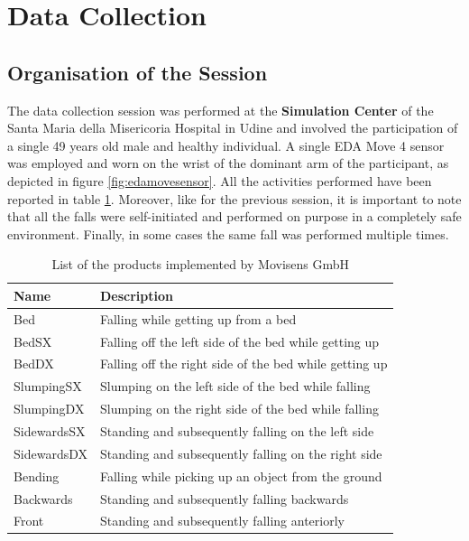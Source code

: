 \section{Data Collection}\label{sec:edamove4-data-collection}

\subsection{Organisation of the Session}\label{subsec:session-org}

The data collection session was performed at the \textbf{Simulation Center} of the Santa Maria della Misericoria Hospital in Udine and involved the participation of a single 49 years old male and healthy individual. A single EDA Move 4 sensor was employed and worn on the wrist of the dominant arm of the participant, as depicted in figure \ref{fig:edamovesensor}. All the activities performed have been reported in table \ref{toc:falls-performed-edamove}. Moreover, like for the previous session, it is important to note that all the falls were self-initiated and performed on purpose in a completely safe environment. Finally, in some cases the same fall was performed multiple times.

\begin{table}[H]
\centering
\begin{tabular}{ll}
    \hline
    Name         & Description \\
    \hline
    Bed          & Falling while getting up from a bed \\
    BedSX        & Falling off the left side of the bed while getting up\\
    BedDX        & Falling off the right side of the bed while getting up \\
    SlumpingSX   & Slumping on the left side of the bed while falling  \\
    SlumpingDX   & Slumping on the right side of the bed while falling  \\
    SidewardsSX  & Standing and subsequently falling on the left side \\ 
    SidewardsDX  & Standing and subsequently falling on the right side \\ 
    Bending      & Falling while picking up an object from the ground \\ 
    Backwards    & Standing and subsequently falling backwards \\
    Front        & Standing and subsequently falling anteriorly  \\
    \hline
\end{tabular}
\caption{List of the products implemented by Movisens GmbH}
\label{toc:falls-performed-edamove}
\end{table}

